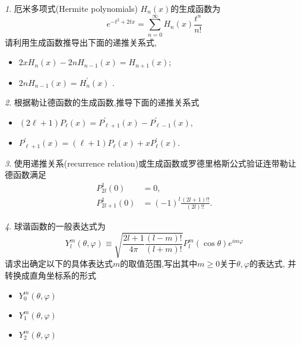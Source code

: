 \documentclass[11pt]{article}
\theoremstyle{remark}
\newtheorem{problem}{}
\begin{document}
\renewcommand{\labelenumi}{(\arabic{enumi})}
\renewcommand{\labelenumii}{(\arabic{enumi}.\arabic{enumii})}

\begin{problem}
  厄米多项式(Hermite polynomials) $H_n(x)$的生成函数为
  $$
  e^{-t^2+2 t x}=\sum_{n=0}^{\infty} H_n(x) \frac{t^n}{n !}
  $$
  请利用生成函数推导出下面的递推关系式,
  \begin{itemize}
    \item[(1)] $2 x H_n(x)-2 n H_{n-1}(x)=H_{n+1}(x)$;
    \item[(2)] $2 n H_{n-1}(x)=H_n^{\prime}(x)$ . 
  \end{itemize}
\end{problem}


\begin{problem}
根据勒让德函数的生成函数,推导下面的递推关系式
\begin{itemize}
  \item[(1)] $
  (2 \ell+1) P_\ell(x)=P_{\ell+1}^{\prime}(x)-P_{\ell-1}^{\prime}(x),
  $
  \item[(2)]
  $
  P_{\ell+1}^{\prime}(x)=(\ell+1) P_\ell(x)+x P_\ell^{\prime}(x).
  $
\end{itemize}

\end{problem}
  

\begin{problem}
  使用递推关系(recurrence relation)或生成函数或罗德里格斯公式验证连带勒让德函数满足
  $$
  \begin{aligned}
  P_{2 l}^1(0) & =0, \\
  P_{2 l+1}^1(0) & =(-1)^{l} \frac{(2 l+1) ! !}{(2 l) ! !}.
  \end{aligned}
  $$
\end{problem}


\begin{problem}
球谐函数的一般表达式为
$$
Y_l^m(\theta, \varphi) \equiv \sqrt{\frac{2 l+1}{4 \pi} \frac{(l-m) !}{(l+m) !}} P_l^m(\cos \theta) e^{i m \varphi}
$$
请求出确定以下的具体表达式$m$的取值范围,写出其中$m\geq 0$关于$\theta,\varphi$的表达式, 并转换成直角坐标系的形式
\begin{itemize}
  \item[(1)] $Y_0^m(\theta,\varphi)$
  \item[(2)] $Y_1^m(\theta,\varphi)$
  \item[(3)] $Y_2^m(\theta,\varphi)$
\end{itemize}
\end{problem}
\end{document}
